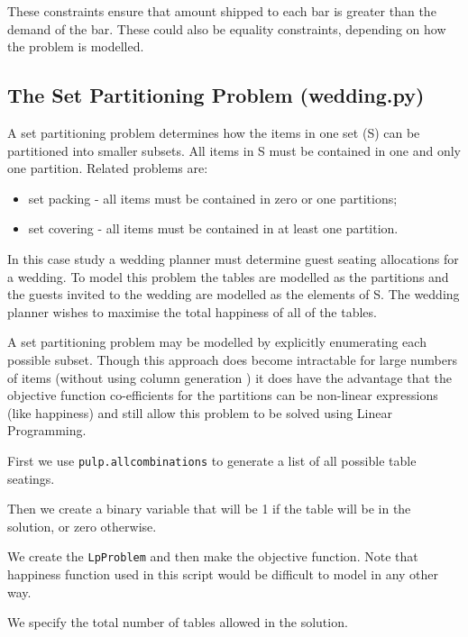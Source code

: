 \documentclass[a4paper,oneside]{arlimsTPPM}
\begin{document}
These constraints ensure that amount shipped to each bar is greater 
than the demand of the bar. These could also be equality constraints, depending 
on how the problem is modelled.


\subsection{The Set Partitioning Problem (wedding.py)}
A set partitioning problem determines how the items in one set (S) can be partitioned into smaller 
subsets. All items in S must be contained in one and only one partition. Related problems are:
\begin{itemize}
 \item set packing - all items must be contained in zero or one partitions;
 \item set covering - all items must be contained in at least one partition.
\end{itemize}
In this case study a wedding planner must determine guest seating 
allocations for 
a wedding. To model this problem the tables are modelled as the partitions and the guests invited to the wedding
are modelled as the elements of S. The wedding planner wishes to maximise the total happiness of all of the tables. 

A set partitioning problem may be modelled by explicitly enumerating each 
possible subset. Though this approach does become intractable for large numbers of items (without using
column generation \cite{columngeneration}) it does have the advantage that the objective function co-efficients for
the partitions can be non-linear expressions (like happiness) and still allow this problem to be solved
using Linear Programming.

First we use \lstinline{pulp.allcombinations} to generate a list of all possible table seatings.


Then we create a binary variable that will be 1 if the table will be in the solution, or zero otherwise.


We create the \lstinline{LpProblem} and then make the objective function. Note that
happiness function used in this script would be difficult to model in any other way.


We specify the total number of tables allowed in the solution.

\end{document}
